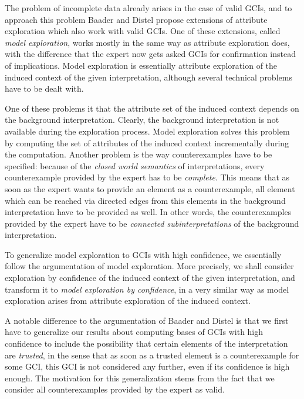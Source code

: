 The problem of incomplete data already arises in the case of valid GCIs, and to approach
this problem Baader and Distel propose extensions of attribute exploration which also work
with valid GCIs.  One of these extensions, called \emph{model exploration}, works mostly
in the same way as attribute exploration does, with the difference that the expert now
gets asked GCIs for confirmation instead of implications.  Model exploration is
essentially attribute exploration of the induced context of the given interpretation,
although several technical problems have to be dealt with.

One of these problems it that the attribute set of the induced context depends on the
background interpretation.  Clearly, the background interpretation is not available during
the exploration process.  Model exploration solves this problem by computing the set of
attributes of the induced context incrementally during the computation.  Another problem
is the way counterexamples have to be specified: because of the \emph{closed world
  semantics} of interpretations, every counterexample provided by the expert has to be
\emph{complete}.  This means that as soon as the expert wants to provide an element as a
counterexample, all element which can be reached via directed edges from this elements in
the background interpretation have to be provided as well.  In other words, the
counterexamples provided by the expert have to be \emph{connected subinterpretations} of
the background interpretation.

To generalize model exploration to GCIs with high confidence, we essentially follow the
argumentation of model exploration.  More precisely, we shall consider exploration by
confidence of the induced context of the given interpretation, and transform it to
\emph{model exploration by confidence}, in a very similar way as model exploration arises
from attribute exploration of the induced context.

A notable difference to the argumentation of Baader and Distel is that we first have to
generalize our results about computing bases of GCIs with high confidence to include the
possibility that certain elements of the interpretation are \emph{trusted}, in the sense
that as soon as a trusted element is a counterexample for some GCI, this GCI is not
considered any further, even if its confidence is high enough.  The motivation for this
generalization stems from the fact that we consider all counterexamples provided by the
expert as valid.


